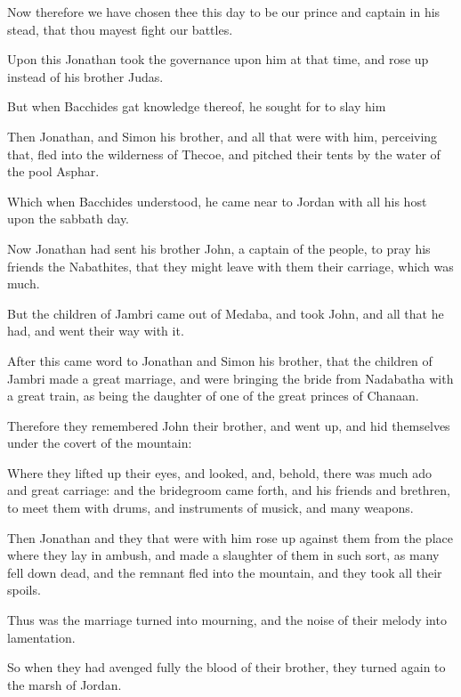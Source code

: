 {\par }{\PP {}Now therefore we have chosen thee this day to be our prince and captain in his stead, that thou mayest fight our battles.
\par }{\PP {}Upon this Jonathan took the governance upon him at that time, and rose up instead of his brother Judas.
\par }{\PP {}But when Bacchides gat knowledge thereof, he sought for to slay him
\par }{\PP {}Then Jonathan, and Simon his brother, and all that were with him, perceiving that, fled into the wilderness of Thecoe, and pitched their tents by the water of the pool Asphar.
\par }{\PP {}Which when Bacchides understood, he came near to Jordan with all his host upon the sabbath day.
\par }{\PP {}Now Jonathan had sent his brother John, a captain of the people, to pray his friends the Nabathites, that they might leave with them their carriage, which was much.
\par }{\PP {}But the children of Jambri came out of Medaba, and took John, and all that he had, and went their way with it.
\par }{\PP {}After this came word to Jonathan and Simon his brother, that the children of Jambri made a great marriage, and were bringing the bride from Nadabatha with a great train, as being the daughter of one of the great princes of Chanaan.
\par }{\PP {}Therefore they remembered John their brother, and went up, and hid themselves under the covert of the mountain:
\par }{\PP {}Where they lifted up their eyes, and looked, and, behold, there was much ado and great carriage: and the bridegroom came forth, and his friends and brethren, to meet them with drums, and instruments of musick, and many weapons.
\par }{\PP {}Then Jonathan and they that were with him rose up against them from the place where they lay in ambush, and made a slaughter of them in such sort, as many fell down dead, and the remnant fled into the mountain, and they took all their spoils.
\par }{\PP {}Thus was the marriage turned into mourning, and the noise of their melody into lamentation.
\par }{\PP {}So when they had avenged fully the blood of their brother, they turned again to the marsh of Jordan.
}
